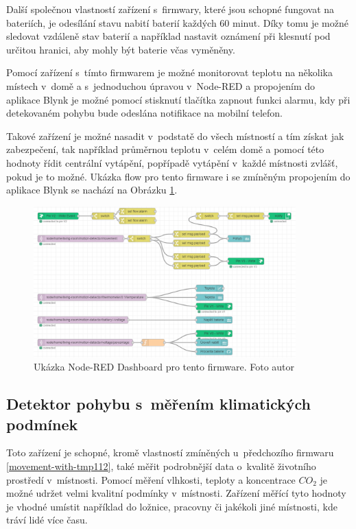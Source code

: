 Další společnou vlastností zařízení s~firmwary, které jsou schopné fungovat na bateriích, je odesílání stavu nabití baterií každých 60 minut. Díky tomu je možné sledovat vzdáleně stav baterií a například nastavit oznámení při klesnutí pod určitou hranici, aby mohly být baterie včas vyměněny. 

Pomocí zařízení s~tímto firmwarem je možné monitorovat teplotu na několika místech v~domě a s~jednoduchou úpravou v~Node-RED a propojením do aplikace Blynk je možné pomocí stisknutí tlačítka zapnout funkci alarmu, kdy při detekovaném pohybu bude odeslána notifikace na mobilní telefon. 

Takové zařízení je možné nasadit v~podstatě do všech místností a tím získat jak zabezpečení, tak například průměrnou teplotu v~celém domě a pomocí této hodnoty řídit centrální vytápění, popřípadě vytápění v~každé místnosti zvlášť, pokud je to možné. Ukázka flow pro tento firmware i se zmíněným propojením do aplikace Blynk se nachází na Obrázku \ref{nodeRedMovementWithTMP112Flow}.

\begin{figure}[H]
  \centering
  \includegraphics[width=0.9\textwidth]{obrazky-figures/flows/movementWithTMP112Flow.PNG}
  \caption{Ukázka Node-RED Dashboard pro tento firmware. Foto autor}
  \label{nodeRedMovementWithTMP112Flow}
\end{figure}

\subsection*{Detektor pohybu s~měřením klimatických podmínek}
Toto zařízení je schopné, kromě vlastností zmíněných u~předchozího firmwaru \ref{movement-with-tmp112}, také měřit podrobnější data o~kvalitě životního prostředí v~místnosti.
Pomocí měření vlhkosti, teploty a koncentrace $CO_2$ je možné udržet velmi kvalitní podmínky v~místnosti. Zařízení měřící tyto hodnoty je vhodné umístit například do ložnice, pracovny či jakékoli jiné místnosti, kde tráví lidé více času.


